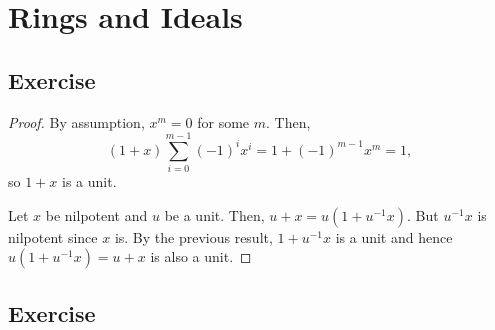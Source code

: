\section{Rings and Ideals}

\subsection{Exercise}\label{1.1}

\begin{proof}
By assumption, $x^m = 0$ for some $m$. Then, 
\[ (1 + x) \sum_{i=0}^{m-1} (-1)^i x^i = 1 + (-1)^{m-1}x^m = 1, \] 
so $1 + x$ is a unit.

Let $x$ be nilpotent and $u$ be a unit. Then, $u + x = u (1 + u^{-1} x)$. But $u^{-1} x$ is nilpotent since $x$ is. By the previous result, $1 + u^{-1} x$ is a unit and hence $u (1 + u^{-1} x) = u + x$ is also a unit.
\end{proof}

\subsection{Exercise}\label{1.2}

